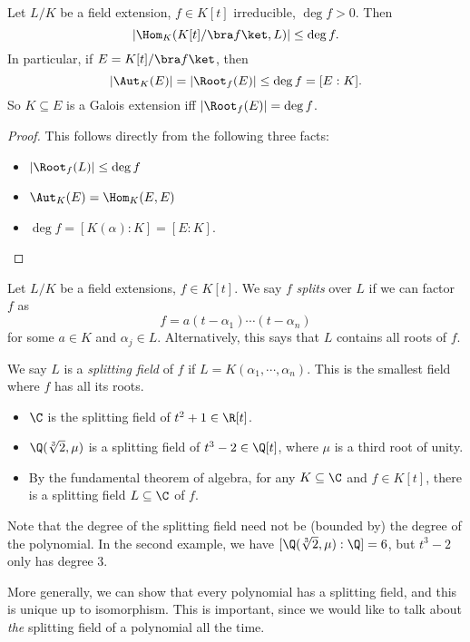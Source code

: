 \documentclass[a4paper]{article}
\begin{document}
\begin{cor}
  Let $L/K$ be a field extension, $f \in K[t]$ irreducible, $\deg f > 0$. Then
  \[
    \left| \Hom_K(K[t]/\bra f\ket, L) \right| \leq \deg f.
  \]
  In particular, if $E = K[t]/\bra f\ket$, then
  \[
    |\Aut_K(E)| = |\Root_f(E)| \leq \deg f = [E:K].
  \]
  So $K \subseteq E$ is a Galois extension iff $|\Root_f(E)| = \deg f$.
\end{cor}

\begin{proof}
  This follows directly from the following three facts:
  \begin{itemize}
    \item $|\Root_f(L)| \leq \deg f$
    \item $\Aut_K(E) = \Hom_K(E, E)$
    \item $\deg f = [K(\alpha): K] = [E:K]$.
  \end{itemize}
\end{proof}

\begin{defi}
  Let $L/K$ be a field extensions, $f\in K[t]$. We say $f$ \emph{splits} over $L$ if we can factor $f$ as
  \[
    f = a(t - \alpha_1)\cdots (t - \alpha_n)
  \]
  for some $a \in K$ and $\alpha_j \in L$. Alternatively, this says that $L$ contains all roots of $f$.

  We say $L$ is a \emph{splitting field} of $f$ if $L = K(\alpha_1, \cdots, \alpha_n)$. This is the smallest field where $f$ has all its roots.
\end{defi}

\begin{eg}\leavevmode
  \begin{itemize}
    \item $\C$ is the splitting field of $t^2 + 1 \in \R[t]$.
    \item $\Q(\sqrt[3]{2}, \mu)$ is a splitting field of $t^3 - 2 \in \Q[t]$, where $\mu$ is a third root of unity.
    \item By the fundamental theorem of algebra, for any $K\subseteq \C$ and $f\in K[t]$, there is a splitting field $L\subseteq \C$ of $f$.
  \end{itemize}
\end{eg}
Note that the degree of the splitting field need not be (bounded by) the degree of the polynomial. In the second example, we have $[\Q(\sqrt[3]{2}, \mu):\Q] = 6$, but $t^3 - 2$ only has degree 3.

More generally, we can show that every polynomial has a splitting field, and this is unique up to isomorphism. This is important, since we would like to talk about \emph{the} splitting field of a polynomial all the time.
\end{document}
